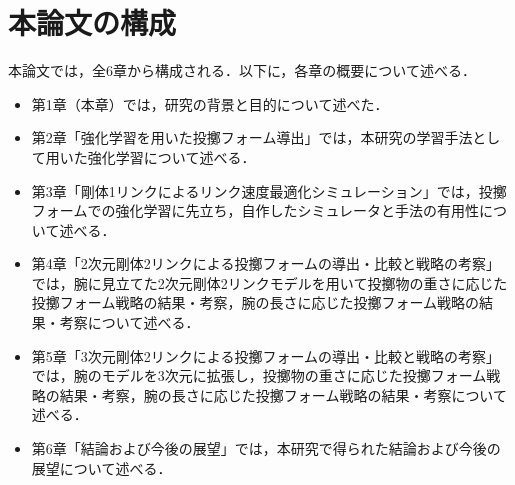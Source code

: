         \section{本論文の構成}
        本論文では，全6章から構成される．以下に，各章の概要について述べる．
        \begin{itemize}
          \item 第1章（本章）では，研究の背景と目的について述べた．
          \item 第2章「強化学習を用いた投擲フォーム導出」では，本研究の学習手法として用いた強化学習について述べる．
          \item 第3章「剛体1リンクによるリンク速度最適化シミュレーション」では，投擲フォームでの強化学習に先立ち，自作したシミュレータと手法の有用性について述べる．
          \item 第4章「2次元剛体2リンクによる投擲フォームの導出・比較と戦略の考察」では，腕に見立てた2次元剛体2リンクモデルを用いて投擲物の重さに応じた投擲フォーム戦略の結果・考察，腕の長さに応じた投擲フォーム戦略の結果・考察について述べる．
          \item 第5章「3次元剛体2リンクによる投擲フォームの導出・比較と戦略の考察」では，腕のモデルを3次元に拡張し，投擲物の重さに応じた投擲フォーム戦略の結果・考察，腕の長さに応じた投擲フォーム戦略の結果・考察について述べる．
          \item 第6章「結論および今後の展望」では，本研究で得られた結論および今後の展望について述べる．
        \end{itemize}
